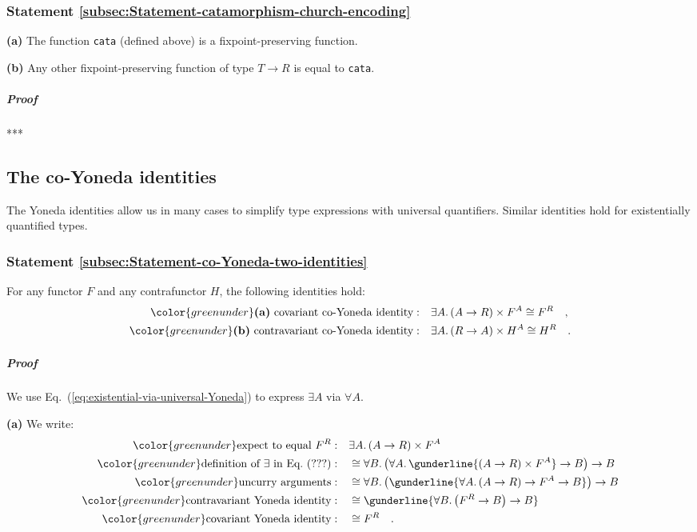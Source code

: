 \subsubsection{Statement \label{subsec:Statement-catamorphism-church-encoding}\ref{subsec:Statement-catamorphism-church-encoding}}

\textbf{(a)} The function \lstinline!cata!
(defined above) is a fixpoint-preserving function.

\textbf{(b)} Any other fixpoint-preserving function of type $T\rightarrow R$
is equal to \lstinline!cata!.

\subparagraph{Proof}

{*}{*}{*}

\subsection{The co-Yoneda identities}

The Yoneda identities allow us in many cases to simplify type expressions
with universal quantifiers. Similar identities hold for existentially
quantified types. 

\subsubsection{Statement \label{subsec:Statement-co-Yoneda-two-identities}\ref{subsec:Statement-co-Yoneda-two-identities}}

For any functor $F$ and any contrafunctor $H$, the following identities
hold:
\begin{align*}
{\color{greenunder}\text{\textbf{(a)} }\text{covariant co-Yoneda identity}:}\quad & \exists A.\,(A\rightarrow R)\times F^{A}\cong F^{R}\quad,\\
{\color{greenunder}\text{\textbf{(b)} }\text{contravariant co-Yoneda identity}:}\quad & \exists A.\,(R\rightarrow A)\times H^{A}\cong H^{R}\quad.
\end{align*}


\subparagraph{Proof}

We use Eq.~(\ref{eq:existential-via-universal-Yoneda}) to express
$\exists A$ via $\forall A$. 

\textbf{(a)} We write:
\begin{align*}
{\color{greenunder}\text{expect to equal }F^{R}:}\quad & \exists A.\,(A\rightarrow R)\times F^{A}\\
{\color{greenunder}\text{definition of }\exists\text{ in Eq.~}(???):}\quad & \cong\forall B.\,\big(\forall A.\,\gunderline{(A\rightarrow R)\times F^{A}}\rightarrow B\big)\rightarrow B\\
{\color{greenunder}\text{uncurry arguments}:}\quad & \cong\forall B.\,\big(\gunderline{\forall A.\,(A\rightarrow R)\rightarrow F^{A}\rightarrow B}\big)\rightarrow B\\
{\color{greenunder}\text{contravariant Yoneda identity}:}\quad & \cong\gunderline{\forall B.\,\big(F^{R}\rightarrow B\big)\rightarrow B}\\
{\color{greenunder}\text{covariant Yoneda identity}:}\quad & \cong F^{R}\quad.
\end{align*}

